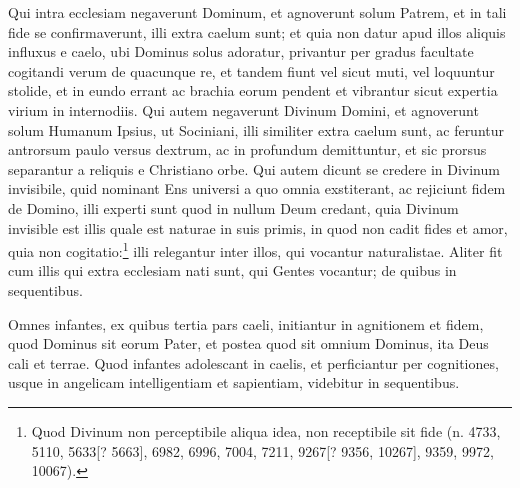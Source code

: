 \begin{topic}{3}
    Qui intra ecclesiam negaverunt Dominum, et agnoverunt solum Patrem, et in tali fide se confirmaverunt, illi extra
    caelum sunt; et quia non datur apud illos aliquis influxus e caelo, ubi Dominus solus adoratur, privantur per gradus
    facultate cogitandi verum de quacunque re, et tandem fiunt vel sicut muti, vel loquuntur stolide, et in eundo errant
    ac brachia eorum pendent et vibrantur sicut expertia virium in internodiis.
    Qui autem negaverunt Divinum Domini, et agnoverunt solum Humanum Ipsius, ut Sociniani, illi similiter extra caelum
    sunt, ac feruntur antrorsum paulo versus dextrum, ac in profundum demittuntur, et sic prorsus separantur a reliquis
    e Christiano orbe.
    Qui autem dicunt se credere in Divinum invisibile, quid nominant Ens universi a quo omnia exstiterant, ac rejiciunt
    fidem de Domino, illi experti sunt quod in nullum Deum credant, quia Divinum invisible est illis quale est naturae
    in suis primis, in quod non cadit fides et amor, quia non cogitatio:\footnote{Quod Divinum non perceptibile aliqua
    idea, non receptibile sit fide (n. 4733, 5110, 5633[? 5663], 6982, 6996, 7004, 7211, 9267[? 9356, 10267], 9359,
    9972, 10067).} illi relegantur inter illos, qui vocantur naturalistae.
    Aliter fit cum illis qui extra ecclesiam nati sunt, qui Gentes vocantur; de quibus in sequentibus.
\end{topic}

\begin{topic}{4}
    Omnes infantes, ex quibus tertia pars caeli, initiantur in agnitionem et fidem, quod Dominus sit eorum Pater, et
    postea quod sit omnium Dominus, ita Deus cali et terrae.
    Quod infantes adolescant in caelis, et perficiantur per cognitiones, usque in angelicam intelligentiam et
    sapientiam, videbitur in sequentibus.
\end{topic}

